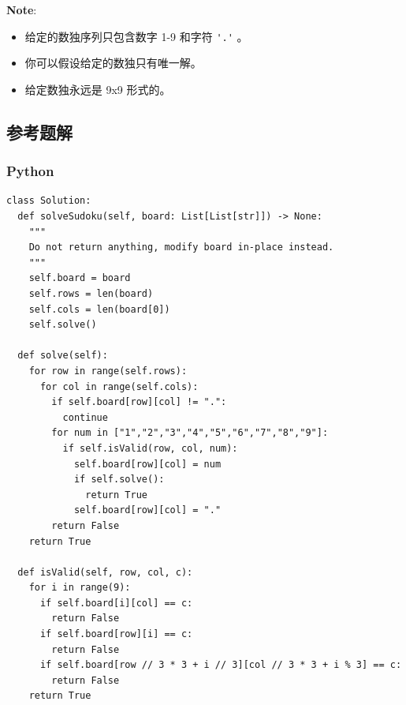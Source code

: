 \textbf{Note}:

\begin{itemize}
  \item 给定的数独序列只包含数字 1-9 和字符 \verb|'.'| 。
  \item 你可以假设给定的数独只有唯一解。
  \item 给定数独永远是 9x9 形式的。
\end{itemize}

\subsection{参考题解}

\subsubsection{Python}

\begin{verbatim}
class Solution:
  def solveSudoku(self, board: List[List[str]]) -> None:
    """
    Do not return anything, modify board in-place instead.
    """
    self.board = board
    self.rows = len(board)
    self.cols = len(board[0])
    self.solve()

  def solve(self):
    for row in range(self.rows):
      for col in range(self.cols):
        if self.board[row][col] != ".":
          continue
        for num in ["1","2","3","4","5","6","7","8","9"]:
          if self.isValid(row, col, num):
            self.board[row][col] = num
            if self.solve():
              return True
            self.board[row][col] = "."
        return False
    return True

  def isValid(self, row, col, c):
    for i in range(9):
      if self.board[i][col] == c:
        return False
      if self.board[row][i] == c:
        return False
      if self.board[row // 3 * 3 + i // 3][col // 3 * 3 + i % 3] == c:
        return False
    return True
\end{verbatim}
